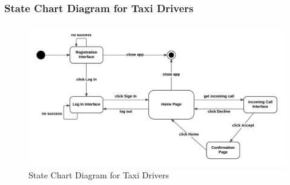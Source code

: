 \subsubsection{State Chart Diagram for Taxi Drivers}

\begin{figure}[htbp]
\centering
\includegraphics[width=\textwidth]{cpt/img/StateChartDriver}
\caption{State Chart Diagram for Taxi Drivers}
\end{figure}